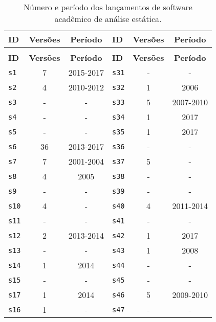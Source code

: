 \begin{longtable}{ l c c | l c c }
\caption{Número e período dos lançamentos de software acadêmico de análise estática.}
\label{releases-table} \\
  \hline
  \hhline{ l c c | l c c |}
  \endfirsthead
  \hhline{ l c c | l c c |}
  \hline
  \textbf{ID} & \textbf{Versões} & \textbf{Período} & \textbf{ID} & \textbf{Versões} & \textbf{Período} \\
  \hline
  \hhline{ l c c | l c c |}
  \endhead
  \hhline{---|---}
  \multicolumn{6}{c}{continua na próxima página} \\
  \hhline{---|---} \endfoot
  \hhline{---|---} \endlastfoot
  \textbf{ID} & \textbf{Versões} & \textbf{Período} & \textbf{ID} & \textbf{Versões} & \textbf{Período} \\
  \hline
      \texttt{s1} & 7 & 2015-2017 &
        \texttt{s31} & - & - \\
      \texttt{s2} & 4 & 2010-2012 &
        \texttt{s32} & 1 & 2006 \\
      \texttt{s3} & - & - &
        \texttt{s33} & 5 & 2007-2010 \\
      \texttt{s4} & - & - &
        \texttt{s34} & 1 & 2017 \\
      \texttt{s5} & - & - &
        \texttt{s35} & 1 & 2017 \\
      \texttt{s6} & 36 & 2013-2017 &
        \texttt{s36} & - & - \\
      \texttt{s7} & 7 & 2001-2004 &
        \texttt{s37} & 5 & - \\
      \texttt{s8} & 4 & 2005 &
        \texttt{s38} & - & - \\
      \texttt{s9} & - & - &
        \texttt{s39} & - & - \\
      \texttt{s10} & 4 & - &
        \texttt{s40} & 4 & 2011-2014 \\
      \texttt{s11} & - & - &
        \texttt{s41} & - & - \\
      \texttt{s12} & 2 & 2013-2014 &
        \texttt{s42} & 1 & 2017 \\
      \texttt{s13} & - & - &
        \texttt{s43} & 1 & 2008 \\
      \texttt{s14} & 1 & 2014 &
        \texttt{s44} & - & - \\
      \texttt{s15} & - & - &
        \texttt{s45} & - & - \\
      \texttt{s17} & 1 & 2014 &
        \texttt{s46} & 5 & 2009-2010 \\
      \texttt{s16} & 1 & - &
        \texttt{s47} & - & - \\

\end{longtable}
